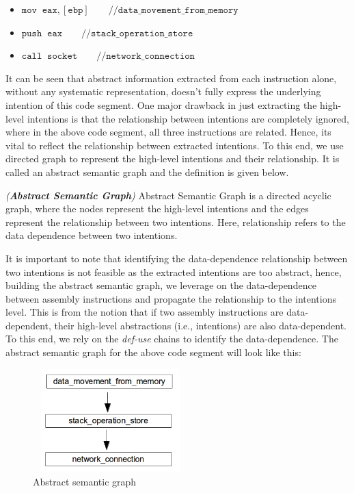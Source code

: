 \begin{itemize}
\itemsep0em 
  \item[] $\mathtt{mov \;\; eax, [ebp] \quad\quad// data\_movement\_from\_memory}$
  \item[] $\mathtt{push \;\; eax \quad\quad// stack\_operation\_store}$
  \item[] $\mathtt{call \;\; socket \quad\quad// network\_connection}$
\end{itemize}
 
It can be seen that abstract information extracted from each instruction alone, without any systematic representation, doesn't fully express the underlying intention of this code segment. One major drawback in just extracting the high-level intentions is that the relationship between intentions are completely ignored, where in the above code segment, all three instructions are related. Hence, its vital to reflect the relationship between extracted intentions. To this end, we use directed graph to represent the high-level intentions and their relationship. It is called an abstract semantic graph and the definition is given below.

\begin{mydef}
\emph{(\textbf{Abstract Semantic Graph}) }  Abstract Semantic Graph is a directed acyclic graph, where the nodes represent the high-level intentions and the edges represent the relationship between two intentions. Here, relationship refers to the data dependence between two intentions.
\end{mydef}

It is important to note that identifying the data-dependence relationship between two intentions is not feasible as the extracted intentions are too abstract, hence, building the abstract semantic graph, we leverage on the data-dependence between assembly instructions and propagate the relationship to the intentions level. This is from the notion that if two assembly instructions are data-dependent, their high-level abstractions (i.e., intentions) are also data-dependent. To this end, we rely on the \textit{def-use} chains to identify the data-dependence. The abstract semantic graph for the above code segment will look like this: 

\begin{figure}[!h]
\begin{center}\vspace{-1mm}
\includegraphics[height=4cm, width=6cm]{srj-figures/srj-graph.png} \vspace{-1mm}
\caption{Abstract semantic graph}
\label{fig:abs} %
\end{center}
\end{figure}

